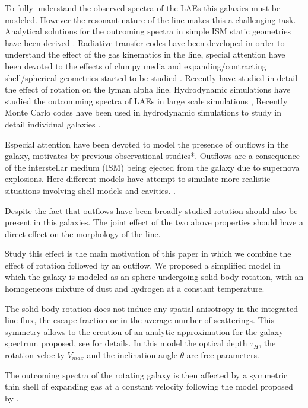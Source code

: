 \documentclass{latex/emulateapj}
\begin{document}
To fully understand the observed spectra of the LAEs this galaxies must be
modeled. However the resonant nature of the line makes this a challenging
task. Analytical solutions for the outcoming spectra in simple ISM static
geometries have been derived \cite{Adams72, Harrington73, Neufeld90,
  Dijkstra06}. Radiative transfer codes \citep{DijkstraKramer, Laursen09, Verhamme06, CLARA}
have been developed in order to understand the effect of the gas kinematics in the
\lya line, special attention have been devoted to  the effects of clumpy media \citep{Hansen06} and
expanding/contracting shell/spherical geometries started to be studied
\citep{Ahn03,Verhamme06,Dijkstra06}. Recently \cite{Garavito14} have studied in
detail the effect of rotation on the lyman alpha line.
Hydrodynamic simulations have studied the
outcomming spectra of LAEs in large scale simulations \cite{Forero12},  
Recently Monte Carlo codes have been used in 
hydrodynamic simulations to study in detail individual galaxies 
\citep{Laursen09,Barnes11,Verhamme12,Yajima12}.


Especial attention have been devoted to model the presence of
outflows in the galaxy, motivates by previous observational 
studies*. Outflows are a consequence of the
interstellar medium (ISM) being ejected from the galaxy due to
supernova explosions. Here different models have attempt to 
simulate more realistic situations involving shell models and cavities. 
\citep{Behrens2014}. 

Despite the fact that outflows have been broadly studied 
rotation should also be present in this galaxies. The joint 
effect of the two above properties should have 
a direct effect on the morphology of the \lya line. 

Study this effect is the main motivation of this paper in which we combine the
effect of rotation followed by an outflow. We proposed a simplified
model in which the galaxy is modeled as an sphere undergoing
solid-body rotation, with an homogeneous mixture of dust and 
hydrogen at a constant temperature.    

The solid-body rotation does not induce any spatial anisotropy in the
integrated line flux,  the escape fraction or in the average number of
scatterings. This symmetry allows to the creation of an analytic
approximation for the galaxy spectrum  proposed, see \cite{Garavito14}
for details. In this model the optical depth $\tau_{H}$, the  rotation
velocity $V_{max}$ and the inclination angle $\theta$ are free
parameters. 
 
The outcoming spectra of the rotating galaxy is then affected by a
symmetric thin shell of expanding gas at a constant velocity following
the model proposed by \cite{2014arXiv1404.2958V, Orsi12}.    
\end{document}
